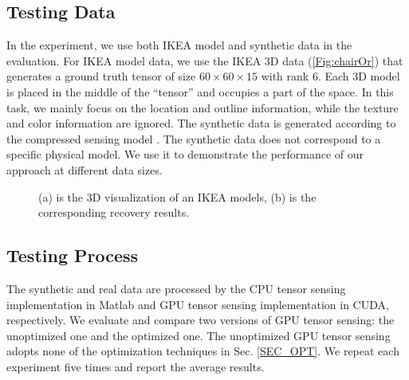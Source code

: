 \documentclass[futureinternet,article,submit,moreauthors,pdftex,10pt,a4paper]{Definitions/mdpi}
\theoremstyle{plain}
\theoremstyle{definition}
\theoremstyle{remark}
\begin{document}
\subsection{Testing Data}
In the experiment, we use both IKEA model and synthetic data in the evaluation. For IKEA model data, we use the IKEA 3D data (\ref{Fig:chairOr}) that generates a ground truth tensor of size $60 \times 60 \times 15$ with rank 6. Each 3D model is placed in the middle of the “tensor” and occupies a part of the space. In this task, we mainly focus on the location and outline information, while the texture and color information are ignored. The synthetic data is generated according to the compressed sensing model \cite{matsuda2017multi}. The synthetic data does not correspond to a specific physical model. We use it to demonstrate the performance of our approach at different data sizes.
\begin{figure}[t]
\centering
{}
\caption{(a) is the 3D visualization of an IKEA models, (b) is the corresponding recovery results.}
\label{Fig:chair}
\end{figure}

\subsection{Testing Process}
The synthetic and real data are processed by the CPU tensor sensing implementation in Matlab and GPU tensor sensing implementation in CUDA, respectively. We evaluate and compare two versions of GPU tensor sensing: the unoptimized one and the optimized one. The unoptimized GPU tensor sensing adopts none of the optimization techniques in Sec. \ref{SEC_OPT}.  We repeat each experiment five times and report the average results.
\end{document}
